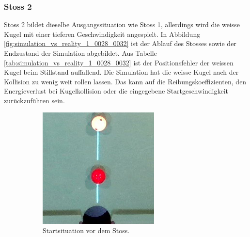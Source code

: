 \subsubsection{Stoss 2}
Stoss 2 bildet dieselbe Ausgangssituation wie Stoss 1, allerdings wird die weisse Kugel mit einer tieferen Geschwindigkeit angespielt.
In Abbildung \ref{fig:simulation_vs_reality_1_0028_0032} ist der Ablauf des Stosses sowie der Endzustand der Simulation abgebildet.
Aus Tabelle \ref{tab:simulation_vs_reality_1_0028_0032} ist der Positionsfehler der weissen Kugel beim Stillstand auffallend.
Die Simulation hat die weisse Kugel nach der Kollision zu wenig weit rollen lassen.
Das kann auf die Reibungskoeffizienten, den Energieverlust bei Kugelkollision oder die eingegebene Startgeschwindigkeit zurückzuführen sein.

\begin{figure}[h!]
    \centering
    \begin{subfigure}[t]{0.2\textwidth}
        \centering
        \includegraphics[width=1.0\linewidth]{../common/04_results/resources/simulation_vs_reality/simulation_vs_reality_1_0028_0032_situation_cut.jpg}
        \caption{Startsituation vor dem Stoss.}
        \label{fig:simulation_vs_reality_1_0028_0032_situation}
    \end{subfigure}
    \hfill
    \begin{subfigure}[t]{0.2\textwidth}

\end{subfigure}
\end{figure}

